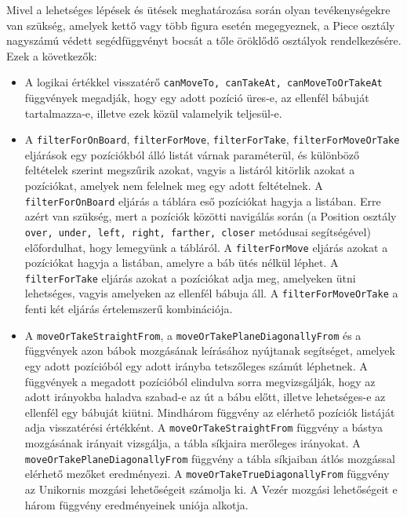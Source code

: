 \documentclass[12pt, twoside]{report}
\begin{document}
Mivel a lehetséges lépések és ütések meghatározása során olyan tevékenységekre van szükség, amelyek kettő vagy több figura esetén megegyeznek, a Piece osztály nagyszámú védett segédfüggvényt bocsát a tőle öröklődő osztályok rendelkezésére. Ezek a következők:
\begin{itemize}
	\item A logikai értékkel visszatérő {\tt canMoveTo, canTakeAt, canMoveToOrTakeAt} függvények megadják, hogy egy adott pozíció üres-e, az ellenfél bábuját tartalmazza-e, illetve ezek közül valamelyik teljesül-e.
	\item A {\tt filterForOnBoard}, {\tt filterForMove}, {\tt filterForTake}, {\tt filterForMoveOrTake} eljárások egy pozíciókból álló listát várnak paraméterül, és különböző feltételek szerint megszűrik azokat, vagyis a listáról kitörlik azokat a pozíciókat, amelyek nem felelnek meg egy adott feltételnek. 
		\subitem A {\tt filterForOnBoard} eljárás a táblára eső pozíciókat hagyja a listában. Erre azért van szükség, mert a pozíciók közötti navigálás során (a Position osztály {\tt over, under, left, right, farther, closer} metódusai segítségével) előfordulhat, hogy lemegyünk a tábláról. 
		\subitem A {\tt filterForMove} eljárás azokat a pozíciókat hagyja a listában, amelyre a báb ütés nélkül léphet.
		\subitem A {\tt filterForTake} eljárás azokat a pozíciókat adja meg, amelyeken ütni lehetséges, vagyis amelyeken az ellenfél bábuja áll.
		\subitem A {\tt filterForMoveOrTake} a fenti két eljárás értelemszerű kombinációja.
	\item A {\tt moveOrTakeStraightFrom}, a {\tt moveOrTakePlaneDiagonallyFrom} és a  függvények azon bábok mozgásának leírásához nyújtanak segítséget, amelyek egy adott pozícióból egy adott irányba tetszőleges számút léphetnek. A függvények a megadott pozícióból elindulva sorra megvizsgálják, hogy az adott irányokba haladva szabad-e az út a bábu előtt, illetve lehetséges-e az ellenfél egy bábuját kiütni. Mindhárom függvény az elérhető pozíciók listáját adja visszatérési értékként. A {\tt moveOrTakeStraightFrom} függvény a bástya mozgásának irányait vizsgálja, a tábla síkjaira merőleges irányokat. A {\tt moveOrTakePlaneDiagonallyFrom} függvény a tábla síkjaiban átlós mozgással elérhető mezőket eredményezi. A {\tt moveOrTakeTrueDiagonallyFrom} függvény az Unikornis mozgási lehetőségeit számolja ki. A Vezér mozgási lehetőségeit e három függvény eredményeinek uniója alkotja.
	

\end{itemize}
\end{document}
